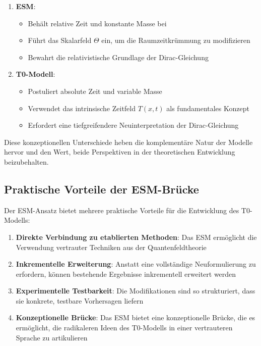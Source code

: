 \documentclass[12pt,a4paper]{article}
\newcommand{\Tfieldt}{T(x,t)}
\begin{document}
	\begin{enumerate}
		\item \textbf{ESM}:
		\begin{itemize}
			\item Behält relative Zeit und konstante Masse bei
			\item Führt das Skalarfeld $\Theta$ ein, um die Raumzeitkrümmung zu modifizieren
			\item Bewahrt die relativistische Grundlage der Dirac-Gleichung
		\end{itemize}
		
		\item \textbf{T0-Modell}:
		\begin{itemize}
			\item Postuliert absolute Zeit und variable Masse
			\item Verwendet das intrinsische Zeitfeld $\Tfieldt$ als fundamentales Konzept
			\item Erfordert eine tiefgreifendere Neuinterpretation der Dirac-Gleichung
		\end{itemize}
	\end{enumerate}
	
	Diese konzeptionellen Unterschiede heben die komplementäre Natur der Modelle hervor und den Wert, beide Perspektiven in der theoretischen Entwicklung beizubehalten.
	
	\subsection{Praktische Vorteile der ESM-Brücke}
	\label{subsec:practical_advantages}
	
	Der ESM-Ansatz bietet mehrere praktische Vorteile für die Entwicklung des T0-Modells:
	
	\begin{enumerate}
		\item \textbf{Direkte Verbindung zu etablierten Methoden}: Das ESM ermöglicht die Verwendung vertrauter Techniken aus der Quantenfeldtheorie
		\item \textbf{Inkrementelle Erweiterung}: Anstatt eine vollständige Neuformulierung zu erfordern, können bestehende Ergebnisse inkrementell erweitert werden
		\item \textbf{Experimentelle Testbarkeit}: Die Modifikationen sind so strukturiert, dass sie konkrete, testbare Vorhersagen liefern
		\item \textbf{Konzeptionelle Brücke}: Das ESM bietet eine konzeptionelle Brücke, die es ermöglicht, die radikaleren Ideen des T0-Modells in einer vertrauteren Sprache zu artikulieren
	\end{enumerate}
	
\end{document}
